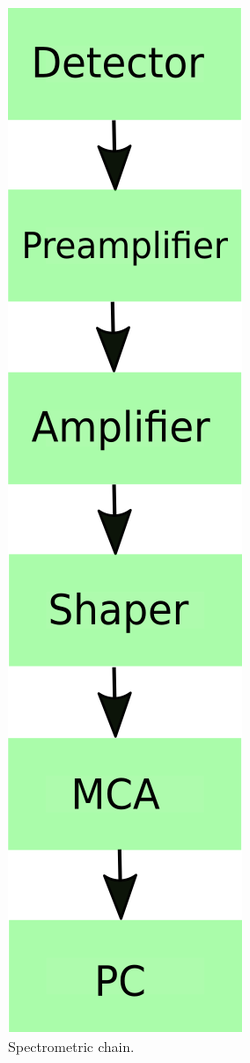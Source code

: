 \begin{figure}[H]
 \centering
 \includegraphics[scale=0.35, angle = 0]{./pictures/chain.png}
 \caption{Spectrometric chain.}
 \label{chain}
 
\end{figure}


